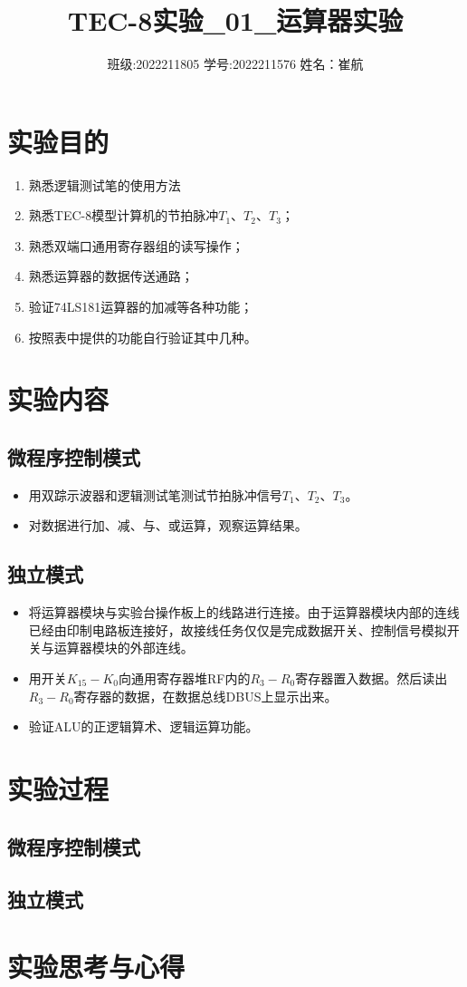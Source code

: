 \documentclass[a4paper]{article}
\title{\heiti\zihao{3} TEC-8实验\_01\_运算器实验}
\date{班级:2022211805  学号:2022211576  姓名：崔航}
\providecommand{\keywords}[1]
{
    \small	
    \textbf{关键词:} #1
}
\providecommand{\keywords}[1]
{
  \small	
  \textbf{关键词:} #1
}
\begin{document}
    \maketitle


\tableofcontents
\section{实验目的}
\begin{enumerate}
    
    \item 熟悉逻辑测试笔的使用方法
    \item 熟悉TEC-8模型计算机的节拍脉冲$T_1$、$T_2$、$T_3$；
    \item 熟悉双端口通用寄存器组的读写操作；
    \item 熟悉运算器的数据传送通路；
    \item 验证74LS181运算器的加减等各种功能；
    \item 按照表中提供的功能自行验证其中几种。
    
\end{enumerate}

\section{实验内容}
\subsection{微程序控制模式}
\begin{itemize}
    \item 用双踪示波器和逻辑测试笔测试节拍脉冲信号$T_1$、$T_2$、$T_3$。
    \item 对数据进行加、减、与、或运算，观察运算结果。
\end{itemize}
\subsection{独立模式}
\begin {itemize}
    \item 将运算器模块与实验台操作板上的线路进行连接。由于运算器模块内部的连线已经由印制电路板连接好，故接线任务仅仅是完成数据开关、控制信号模拟开关与运算器模块的外部连线。
    \item 用开关$K_{15}-K_{0}$向通用寄存器堆RF内的$R_3-R_0$寄存器置入数据。然后读出$R_3-R_0$寄存器的数据，在数据总线DBUS上显示出来。
    \item 验证ALU的正逻辑算术、逻辑运算功能。
    
\end{itemize}
\section{实验过程}
\subsection{微程序控制模式}

\subsection{独立模式}

\section{实验思考与心得}
\end{document}
